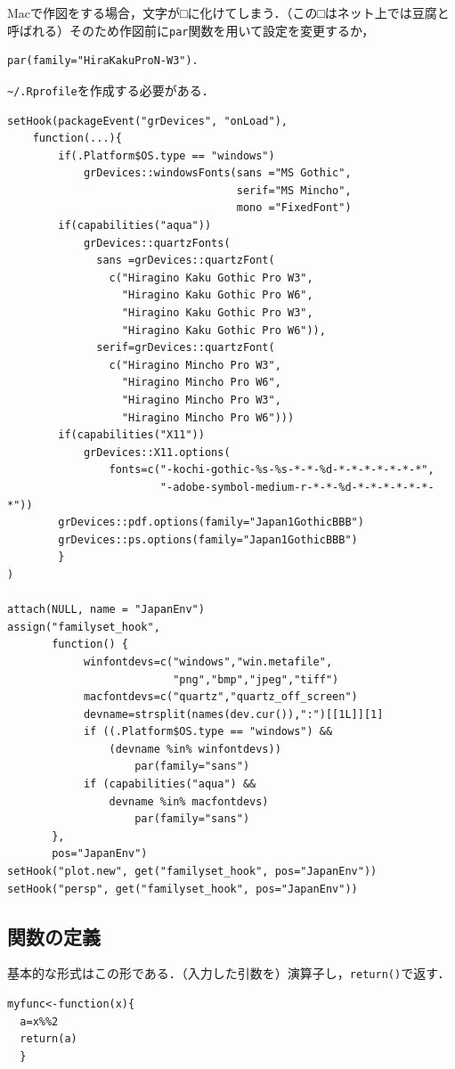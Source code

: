 Macで作図をする場合，文字が□に化けてしまう．（この□はネット上では豆腐と呼ばれる）そのため作図前に{\tt par}関数を用いて設定を変更するか，
\begin{screen}
\begin{verbatim}
par(family="HiraKakuProN-W3").
\end{verbatim}
\end{screen}
\verb+~/.Rprofile+を作成する必要がある．
\begin{screen}
\begin{verbatim}
setHook(packageEvent("grDevices", "onLoad"),
	function(...){
        if(.Platform$OS.type == "windows")
            grDevices::windowsFonts(sans ="MS Gothic",
                                    serif="MS Mincho",
                                    mono ="FixedFont")
        if(capabilities("aqua"))
            grDevices::quartzFonts(
              sans =grDevices::quartzFont(
                c("Hiragino Kaku Gothic Pro W3",
                  "Hiragino Kaku Gothic Pro W6",
                  "Hiragino Kaku Gothic Pro W3",
                  "Hiragino Kaku Gothic Pro W6")),
              serif=grDevices::quartzFont(
                c("Hiragino Mincho Pro W3",
                  "Hiragino Mincho Pro W6",
                  "Hiragino Mincho Pro W3",
                  "Hiragino Mincho Pro W6")))
        if(capabilities("X11"))
            grDevices::X11.options(
                fonts=c("-kochi-gothic-%s-%s-*-*-%d-*-*-*-*-*-*-*",
                        "-adobe-symbol-medium-r-*-*-%d-*-*-*-*-*-*-*"))
        grDevices::pdf.options(family="Japan1GothicBBB")
        grDevices::ps.options(family="Japan1GothicBBB")
        }
)

attach(NULL, name = "JapanEnv")
assign("familyset_hook",
       function() {
            winfontdevs=c("windows","win.metafile",
                          "png","bmp","jpeg","tiff")
            macfontdevs=c("quartz","quartz_off_screen")
            devname=strsplit(names(dev.cur()),":")[[1L]][1]
            if ((.Platform$OS.type == "windows") &&
                (devname %in% winfontdevs))
                    par(family="sans")
            if (capabilities("aqua") &&
                devname %in% macfontdevs)
                    par(family="sans")
       },
       pos="JapanEnv")
setHook("plot.new", get("familyset_hook", pos="JapanEnv"))
setHook("persp", get("familyset_hook", pos="JapanEnv"))
\end{verbatim}
\end{screen}
\subsection{関数の定義}
基本的な形式はこの形である．（入力した引数を）演算子し，{\tt return()}で返す．
\begin{screen}
\begin{verbatim}
myfunc<-function(x){
  a=x%%2
  return(a)
  }
\end{verbatim}
\end{screen}
